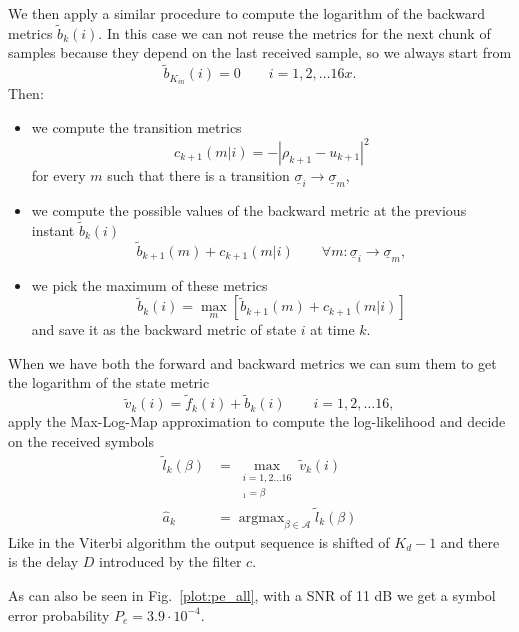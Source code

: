 \documentclass[a4paper,oneside]{article}
\renewcommand{\vec}[1]{\underline{#1}}
\newcommand{\abs}[1]{\left|#1\right|}
\DeclareMathOperator*{\argmax}{argmax}
\newcommand{\vsigma}[0]{\vec{\sigma}}
\begin{document}
We then apply a similar procedure to compute the logarithm of the
backward metrics $\tilde{b}_k(i)$. In this case we can not reuse the
metrics for the next chunk of samples because they depend on the last
received sample, so we always start from
\begin{equation}
  \tilde{b}_{K_{in}}(i) = 0 \qquad i = 1,2,\dots16x .
\end{equation}
Then:
\begin{itemize}
\item we compute the transition metrics
  \begin{equation}
    c_{k+1}(m|i) = -\abs{\rho_{k+1} - u_{k+1}}^2
  \end{equation}
  for every $m$ such that there is a transition $\vsigma_i \rightarrow
  \vsigma_m$,
  \item we compute the possible values of the backward metric at the
    previous instant $\tilde{b}_k(i)$
    \begin{equation}
      \tilde{b}_{k+1}(m) + c_{k+1}(m|i) \qquad \forall m : \vsigma_i
      \rightarrow \vsigma_m ,
    \end{equation}
    \item we pick the maximum of these metrics
    \begin{equation}
       \tilde{b}_{k}(i)  = \max_{m} \left[ \tilde{b}_{k+1}(m) + c_{k+1}(m|i) \right] 
    \end{equation}
    and save it as the backward metric of state $i$ at time $k$.
\end{itemize}

When we have both the forward and backward metrics we can sum them to
get the logarithm of the state metric
\begin{equation}
  \tilde{v}_k(i) = \tilde{f}_k(i) + \tilde{b}_k(i) \qquad i=1,2,\dots16 ,
\end{equation}
apply the Max-Log-Map approximation to compute the log-likelihood and
decide on the received symbols
\begin{align}
  \tilde{l}_k(\beta) &= \max_{\substack{i=1,2\dots16 \\ [\vsigma_i]_1 = \beta}} \tilde{v}_k(i) \\
  \hat{a}_k &= \argmax_{\beta \in \mathcal{A}} \tilde{l}_k(\beta)
\end{align}
Like in the Viterbi algorithm the output sequence is shifted of $K_d
-1$ and there is the delay $D$ introduced by the filter $c$.

As can also be seen in Fig.~\ref{plot:pe_all}, with a SNR of 11 dB we
get a symbol error probability {\color{red}$P_e = 3.9 \cdot 10^{-4}$.}
\end{document}
